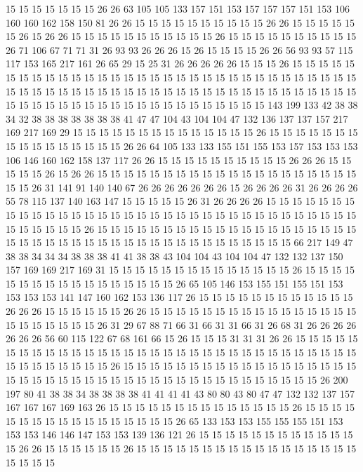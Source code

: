 15 15 15 15 15 15 15 26 26 63 105 105 133 157 151 153 157 157 157 151
153 106 160 160 162 158 150 81 26 26 15 15 15 15 15 15 15 15 15 15
26 26 15 15 15 15 15 15 26 15 26 26 15 15 15 15 15 15 15 15
15 15 15 26 15 15 15 15 15 15 15 15 15 15 26 71 106 67 71 71
31 26 93 93 26 26 26 15 26 15 15 15 15 26 26 56 93 93 57 115
117 153 165 217 161 26 65 29 15 25 31 26 26 26 26 26 15 15 15 26
15 15 15 15 15 15 15 15 15 15 15 15 15 15 15 15 15 15 15 15
15 15 15 15 15 15 15 15 15 15 15 15 15 15 15 15 15 15 15 15
15 15 15 15 15 15 15 15 15 15 15 15 15 15 15 15 15 15 15 15
15 15 15 15 15 15 15 15 15 15 15 15 15 15 15 15 15 15 15 143
199 133 42 38 38 34 32 38 38 38 38 38 38 38 41 47 47 104 43 104
104 47 132 136 137 137 157 217 169 217 169 29 15 15 15 15 15 15 15 15
15 15 15 15 15 15 26 15 15 15 15 15 15 15 15 15 15 15 15 15
15 15 15 26 26 64 105 133 133 155 151 155 153 157 153 153 153 106 146 160
162 158 137 117 26 26 15 15 15 15 15 15 15 15 15 15 26 26 26 15
15 15 15 15 26 15 26 26 15 15 15 15 15 15 15 15 15 15 15 15
15 15 15 15 15 15 15 15 15 15 26 31 141 91 140 140 67 26 26 26
26 26 26 26 15 26 26 26 26 31 26 26 26 26 55 78 115 137 140 163
147 15 15 15 15 15 26 31 26 26 26 26 15 15 15 15 15 15 15 15
15 15 15 15 15 15 15 15 15 15 15 15 15 15 15 15 15 15 15 15
15 15 15 15 15 15 15 15 15 15 15 15 26 15 15 15 15 15 15 15
15 15 15 15 15 15 15 15 15 15 15 15 15 15 15 15 15 15 15 15
15 15 15 15 15 15 15 15 15 15 15 15 15 15 15 66 217 149 47 38
38 34 34 34 38 38 38 41 41 38 38 43 104 104 43 104 104 47 132 132
137 150 157 169 169 217 169 31 15 15 15 15 15 15 15 15 15 15 15 15
15 15 26 15 15 15 15 15 15 15 15 15 15 15 15 15 15 15 15 15
26 65 105 146 153 155 151 155 151 153 153 153 153 141 147 160 162 153 136 117
26 15 15 15 15 15 15 15 15 15 15 15 15 26 26 26 15 15 15 15
15 15 26 26 15 15 15 15 15 15 15 15 15 15 15 15 15 15 15 15
15 15 15 15 15 15 15 26 31 29 67 88 71 66 31 66 31 31 66 31
26 68 31 26 26 26 26 26 26 26 56 60 115 122 67 68 161 66 15 26
15 15 15 31 31 31 26 26 15 15 15 15 15 15 15 15 15 15 15 15
15 15 15 15 15 15 15 15 15 15 15 15 15 15 15 15 15 15 15 15
15 15 15 15 15 15 15 15 26 15 15 15 15 15 15 15 15 15 15 15
15 15 15 15 15 15 15 15 15 15 15 15 15 15 15 15 15 15 15 15
15 15 15 15 15 15 15 15 15 15 15 26 200 197 80 41 38 38 34 38
38 38 38 41 41 41 41 43 80 80 43 80 47 47 132 132 137 157 167 167
167 169 163 26 15 15 15 15 15 15 15 15 15 15 15 15 15 15 26 15
15 15 15 15 15 15 15 15 15 15 15 15 15 15 15 15 26 65 133 153
153 155 155 155 151 153 153 153 146 146 147 153 153 139 136 121 26 15 15 15
15 15 15 15 15 15 15 15 15 15 26 26 15 15 15 15 15 15 26 15
15 15 15 15 15 15 15 15 15 15 15 15 15 15 15 15 15 15 15 15
